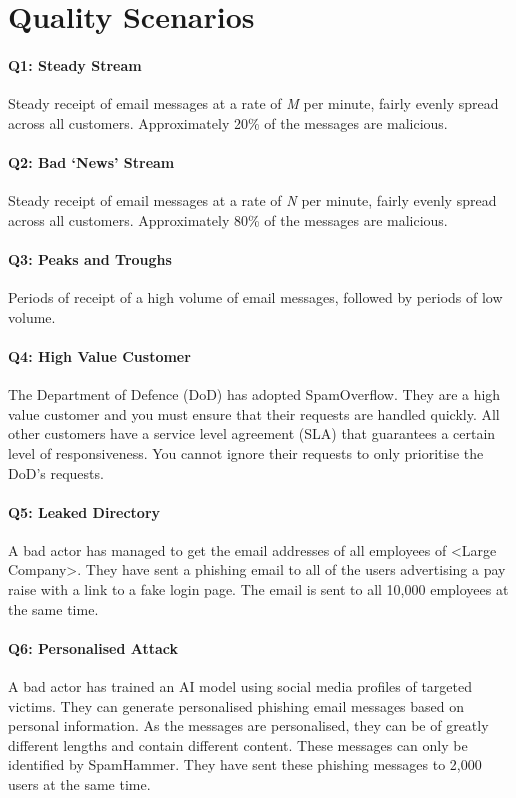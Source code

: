 \documentclass{csse4400}
\begin{document}
\section{Quality Scenarios}\label{sec:scenarios}

\paragraph{Q1: Steady Stream}
Steady receipt of email messages at a rate of \emph{M} per minute, fairly evenly spread across all customers.
Approximately 20\% of the messages are malicious.

\paragraph{Q2: Bad `News' Stream}
Steady receipt of email messages at a rate of \emph{N} per minute, fairly evenly spread across all customers.
Approximately 80\% of the messages are malicious.

\paragraph{Q3: Peaks and Troughs}
Periods of receipt of a high volume of email messages, followed by periods of low volume.

\paragraph{Q4: High Value Customer}
The Department of Defence (DoD) has adopted SpamOverflow.
They are a high value customer and you must ensure that their requests are handled quickly.
All other customers have a service level agreement (SLA) that guarantees a certain level of responsiveness.
You cannot ignore their requests to only prioritise the DoD's requests.

\paragraph{Q5: Leaked Directory}
A bad actor has managed to get the email addresses of all employees of <Large Company>.
They have sent a phishing email to all of the users advertising a pay raise with a link to a fake login page.
The email is sent to all 10,000 employees at the same time.

\paragraph{Q6: Personalised Attack}
A bad actor has trained an AI model using social media profiles of targeted victims.
They can generate personalised phishing email messages based on personal information.
As the messages are personalised, they can be of greatly different lengths and contain different content.
These messages can only be identified by SpamHammer.
They have sent these phishing messages to 2,000 users at the same time.
\end{document}
